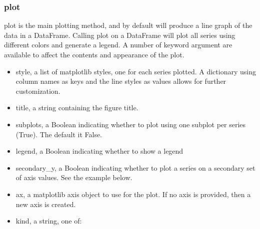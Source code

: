 \documentclass[KSmain.tex]{subfiles}
\begin{document}
\subsubsection{plot}
plot is the main plotting method, and by default will produce a line graph of the data in a DataFrame.
Calling plot on a DataFrame will plot all series using different colors and generate a legend. A number of
keyword argument are available to affect the contents and appearance of the plot.
\begin{itemize}
\item style, a list of matplotlib styles, one for each series plotted. A dictionary using column names as
keys and the line styles as values allows for further customization.
\item title, a string containing the figure title.
\item subplots, a Boolean indicating whether to plot using one subplot per series (True). The default it
False.
\item legend, a Boolean indicating whether to show a legend
\item secondary\_y, a Boolean indicating whether to plot a series on a secondary set of axis values. See the
example below.
\item ax, a matplotlib axis object to use for the plot. If no axis is provided, then a new axis is created.
\item kind, a string, one of:
\end{itemize}

\end{document}
